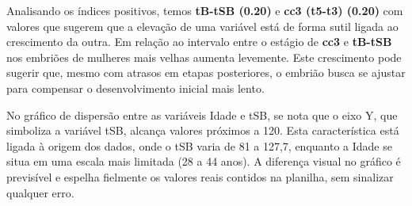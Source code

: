 Analisando os índices positivos, temos \textbf{tB-tSB (0.20)} e \textbf{cc3 (t5-t3) (0.20)} com valores que sugerem que a elevação de uma variável está de forma sutil ligada ao crescimento da outra. Em relação ao intervalo entre o estágio de \textbf{cc3} e \textbf{tB-tSB} nos embriões de mulheres mais velhas aumenta levemente. Este crescimento pode sugerir que, mesmo com atrasos em etapas posteriores, o embrião busca se ajustar para compensar o desenvolvimento inicial mais lento.

No gráfico de dispersão entre as variáveis Idade e tSB, se nota que o eixo Y, que simboliza a variável tSB, alcança valores próximos a 120. Esta característica está ligada à origem dos dados, onde o tSB varia de 81 a 127,7, enquanto a Idade se situa em uma escala mais limitada (28 a 44 anos). A diferença visual no gráfico é previsível e espelha fielmente os valores reais contidos na planilha, sem sinalizar qualquer erro.

